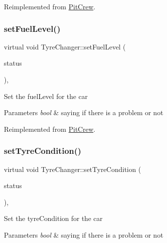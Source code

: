 Reimplemented from \mbox{\hyperlink{class_pit_crew_a41051dd7081efeac022cc3a35a592c64}{Pit\+Crew}}.

\mbox{\label{class_tyre_changer_a22ba050947a3cea4372fc574d6fae910}} 
\subsubsection{\texorpdfstring{set\+Fuel\+Level()}{setFuelLevel()}}
{\footnotesize\ttfamily virtual void Tyre\+Changer\+::set\+Fuel\+Level (\begin{DoxyParamCaption}\item[{bool}]{status }\end{DoxyParamCaption})\hspace{0.3cm}{\ttfamily [inline]}, {\ttfamily [virtual]}}

Set the fuel\+Level for the car 
\begin{DoxyParams}{Parameters}
{\em bool} & saying if there is a problem or not \\
\hline
\end{DoxyParams}


Reimplemented from \mbox{\hyperlink{class_pit_crew_a8c137bb619ab3a331f4f1d7023477e4b}{Pit\+Crew}}.

\mbox{\label{class_tyre_changer_a1a0df7cbe3bd488bdc54fd1e14fefd1b}} 
\subsubsection{\texorpdfstring{set\+Tyre\+Condition()}{setTyreCondition()}}
{\footnotesize\ttfamily virtual void Tyre\+Changer\+::set\+Tyre\+Condition (\begin{DoxyParamCaption}\item[{bool $\ast$}]{status }\end{DoxyParamCaption})\hspace{0.3cm}{\ttfamily [inline]}, {\ttfamily [virtual]}}

Set the tyre\+Condition for the car 
\begin{DoxyParams}{Parameters}
{\em bool} & saying if there is a problem or not \\
\hline
\end{DoxyParams}



